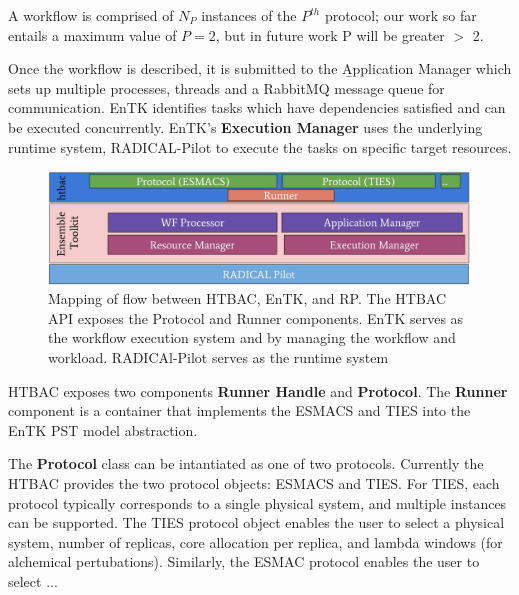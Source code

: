 A workflow is comprised of $N_P$ instances of the $P^{th}$ protocol; our work
so far entails a maximum value of $P = 2$, but in future work P will be
greater $>$ 2.

Once the workflow is described, it is submitted to the \b{Application
Manager} which sets up multiple processes, threads and a RabbitMQ message
queue for communication. EnTK identifies tasks which have dependencies
satisfied and can be executed concurrently. EnTK's \textbf{Execution Manager}
uses the underlying runtime system, RADICAL-Pilot to execute the tasks on
specific target resources.

\begin{figure}
  \centering
   \includegraphics[width=\columnwidth]{figures/isc_htbac_integration_with_entk_RP.pdf}
  \caption{Mapping of flow between HTBAC, EnTK, and RP. The HTBAC API exposes the Protocol
  and Runner components. EnTK serves as the workflow execution system and
  by managing the workflow and workload. RADICAl-Pilot serves as the runtime system}
\label{fig:integration}
\end{figure}


HTBAC exposes two components \textbf{Runner Handle} and \textbf{Protocol}.
The \textbf{Runner} component is a container  that implements the ESMACS and TIES into the
EnTK PST model abstraction. 

The \textbf{Protocol} class can be intantiated as one of two protocols.
Currently the HTBAC provides the two protocol objects: ESMACS and TIES. For
TIES, each protocol typically corresponds to a single physical system, and
multiple instances can be supported. The TIES protocol object enables the user
to select a physical system, number of replicas, core allocation per replica,
and lambda windows (for alchemical pertubations). Similarly, the ESMAC
protocol enables the user to select ...



